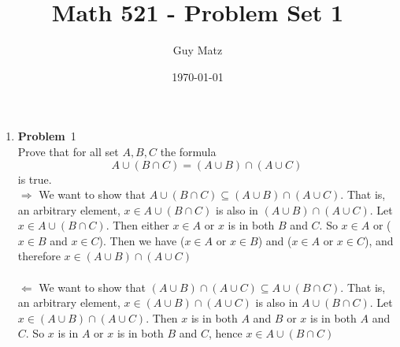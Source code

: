 \documentclass[12pt]{amsart}
\title{\textbf{Math 521 - Problem Set 1}}
\author{Guy Matz}
\date{\today}
\theoremstyle{definition}
\newcommand{\itep}{\item {\bfseries Problem}\ }
\begin{document}
 

\maketitle
\newpage %

\begin{enumerate}[series=p]
\itep 1
\\
Prove that for all set $A, B, C$ the formula
$$A \cup (B \cap C) = (A \cup B) \cap (A \cup C)$$
is true.
\\
$\Rightarrow$ We want to show that $A \cup (B \cap C) \subseteq (A \cup B) \cap (A \cup C)$.  That is, an arbitrary element, $x \in A \cup (B \cap C)$ is also in $(A \cup B) \cap (A \cup C)$.  Let $x \in A \cup(B \cap C)$.  Then either $x \in A$ or $x$ is in both $B$ and $C$.  So $x \in A$ or ($x \in B$ and $x \in C$).  Then we have ($x \in A$ or $x \in B$) and ($x \in A$ or $x \in C$), and therefore $x \in (A \cup B) \cap (A \cup C)$
\\\\
$\Leftarrow$ We want to show that $(A \cup B) \cap (A \cup C) \subseteq A \cup (B \cap C)$.  That is, an arbitrary element, $x \in (A \cup B) \cap (A \cup C)$ is also in $A \cup (B \cap C)$.  Let $x \in (A \cup B) \cap (A \cup C)$.  Then $x$ is in both $A$ and $B$ or $x$ is in both $A$ and $C$.  So $x$ is in $A$ or $x$ is in both $B$ and $C$, hence $x \in A \cup (B \cap C)$
\newpage %


\end{enumerate}
\end{document}

